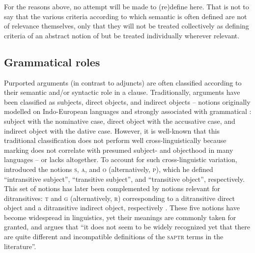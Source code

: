 For the reasons above, no attempt will be made to (re)define  here. That is not to say that the various criteria according to which semantic  is often defined are not of relevance themselves, only that they will not be treated collectively as defining criteria of an abstract notion of  but be treated individually wherever relevant.  

\subsection{Grammatical roles} \label{grammatical-roles}
Purported arguments (in contrast to adjuncts) are often classified according to their semantic and/or syntactic role in a clause. Traditionally, arguments have been classified as subjects, direct objects, and indirect objects -- notions originally modelled on Indo-European languages and strongly associated with grammatical : subject with the nominative case, direct object with the accusative case, and indirect object with the dative case. However, it is well-known that this traditional classification does not perform well cross-linguistically because  marking does not correlate with presumed subject- and objecthood in many languages -- or lacks altogether. To account for such cross-linguistic variation, \citet[59, 128]{dixon:1972} introduced the notions \textsc{s}, \textsc{a}, and \textsc{o} (alternatively, \textsc{p}), which he defined “intransitive subject”, “transitive subject”, and “transitive object”, respectively. This set of notions has later been complemented by notions relevant for ditransitives: \textsc{t} and \textsc{g} (alternatively, \textsc{r}) corresponding to a ditransitive direct object and a ditransitive indirect object, respectively \citep{croft:1990}. These five notions have become widespread in linguistics, yet their meanings are commonly taken for granted, and \citet[536]{haspelmath:2011a} argues that “it does not seem to be widely recognized yet that there are quite different and incompatible definitions of the \textsc{saptr} terms in the literature”.

